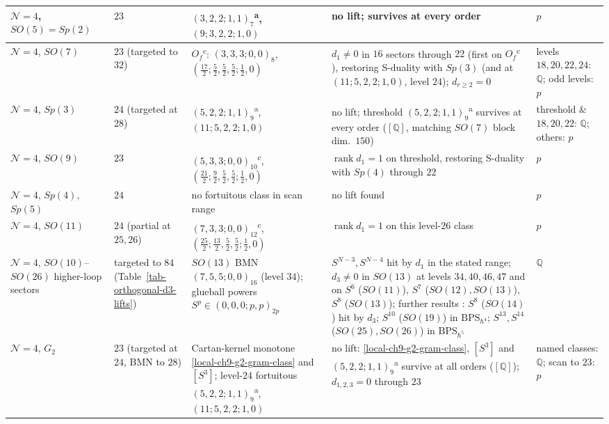 \documentclass[11pt]{article}
\numberwithin{equation}{section}
\numberwithin{figure}{section}
\numberwithin{table}{section}
\begin{document}
{\begin{xltabular}{\linewidth}{|>{\raggedright\arraybackslash}p{2.35cm}|>{\raggedright\arraybackslash}p{2.15cm}|>{\raggedright\arraybackslash}X|>{\raggedright\arraybackslash}X|>{\raggedright\arraybackslash}p{1.75cm}|}
\hline
$\mathcal N=4$, $SO(5)=Sp(2)$ & $23$ & $(3,2,2;1,1)_7$\textsuperscript{a}, $(9;3,2,2;1,0)$ & no lift; survives at every order & $p$\\
\hline
$\mathcal N=4$, $SO(7)$ & $23$ (targeted to $32$) & $O_f$\textsuperscript{c}: $(3,3,3;0,0)_8$, $(\tfrac{17}2;\tfrac52,\tfrac52,\tfrac52;\tfrac12,0)$ \cite{GLRT} & $d_1\ne0$ in $16$ sectors through $22$ (first on $O_f$\textsuperscript{c} \cite{KonishiBH}), restoring S-duality with $Sp(3)$ (and at $(11;5,2,2;1,0)$, level $24$); $d_{r\ge2}=0$ & levels $18,20,22,24$: $\mathbb Q$; odd levels: $p$\\
\hline
$\mathcal N=4$, $Sp(3)$ & $24$ (targeted at $28$) & $(5,2,2;1,1)_9$\textsuperscript{a}, $(11;5,2,2;1,0)$ & no lift; threshold $(5,2,2;1,1)_9$\textsuperscript{a} survives at every order ($[\mathbb Q]$, matching $SO(7)$ block dim.\ $150$) & threshold \& $18,20,22$: $\mathbb Q$; others: $p$\\
\hline
$\mathcal N=4$, $SO(9)$ & $23$ & $(5,3,3;0,0)_{10}$\textsuperscript{c}, $(\tfrac{21}2;\tfrac92,\tfrac52,\tfrac52;\tfrac12,0)$ & $\operatorname{rank}d_1=1$ on threshold, restoring S-duality with $Sp(4)$ through $22$ & $p$\\
\hline
$\mathcal N=4$, $Sp(4)$, $Sp(5)$ & $24$ & no fortuitous class in scan range & no lift found & $p$\\
\hline
$\mathcal N=4$, $SO(11)$ & $24$ (partial at $25,26$) & $(7,3,3;0,0)_{12}$\textsuperscript{c}, $(\tfrac{25}2;\tfrac{13}2,\tfrac52,\tfrac52;\tfrac12,0)$ & $\operatorname{rank}d_1=1$ on this level-$26$ class & $p$\\
\hline
$\mathcal N=4$, $SO(10)$--$SO(26)$ higher-loop sectors & targeted to $84$ (Table~\ref{tab-orthogonal-d3-lifts}) & $SO(13)$ BMN $(7,5,5;0,0)_{16}$ (level $34$); glueball powers $S^p\in(0,0,0;p,p)_{2p}$ & $S^{N-3},S^{N-4}$ hit by $d_1$ in the stated range; $d_3\ne0$ in $SO(13)$ at levels $34,40,46,47$ and on $S^6$ ($SO(11)$), $S^7$ ($SO(12),SO(13)$), $S^8$ ($SO(13)$); further results \cite{Repo}: $S^8$ ($SO(14)$) hit by $d_3$; $S^{10}$ ($SO(19)$) in $\mathrm{BPS}_{\hbar^4}$; $S^{13},S^{14}$ ($SO(25),SO(26)$) in $\mathrm{BPS}_{\hbar^5}$ & $\mathbb Q$\\
\hline
$\mathcal N=4$, $G_2$ & $23$ (targeted at $24$, BMN to $28$) & Cartan-kernel monotone \eqref{local-ch9-g2-gram-class} and $[S^3]$; level-$24$ fortuitous $(5,2,2;1,1)_9$\textsuperscript{a}, $(11;5,2,2;1,0)$ & no lift: \eqref{local-ch9-g2-gram-class}, $[S^3]$ and $(5,2,2;1,1)_9$\textsuperscript{a} survive at all orders ($[\mathbb Q]$); $d_{1,2,3}=0$ through $23$ & named classes: $\mathbb Q$; scan to $23$: $p$\\

\end{xltabular}}
\end{document}
